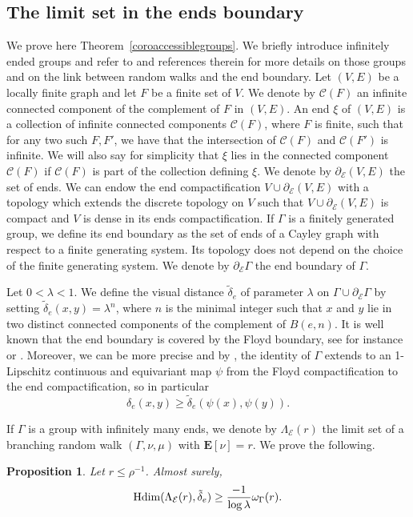 \documentclass{amsart}
\newtheorem{prop}[thm]{Proposition}
\theoremstyle{definition}
\theoremstyle{remark}
\newcommand{\Hdim}{{\rm Hdim}}
\begin{document}
\subsection{The limit set in the ends boundary}\label{sectionends}
We prove here Theorem~\ref{coroaccessiblegroups}.
We briefly introduce infinitely ended groups and refer to \cite[Section~4]{DussauleYang} and references therein for more details on those groups and on the link between random walks and the end boundary.
Let $(V,E)$ be a locally finite graph and let $F$ be a finite set of $V$.
We denote by $\mathcal{C}(F)$ an infinite connected component of the complement of $F$ in $(V,E)$.
An end $\xi$ of $(V,E)$ is a collection of infinite connected components $\mathcal{C}(F)$, where $F$ is finite, such that for any two such $F,F'$, we have that the intersection of $\mathcal{C}(F)$ and $\mathcal{C}(F')$ is infinite.
We will also say for simplicity that $\xi$ lies in the connected component $\mathcal{C}(F)$ if $\mathcal{C}(F)$ is part of the collection defining $\xi$.
We denote by $\partial_{\mathcal{E}}(V,E)$ the set of ends.
We can endow the end compactification $V\cup \partial_{\mathcal{E}}(V,E)$ with a topology which extends the discrete topology on $V$ such that $V\cup \partial_{\mathcal{E}}(V,E)$ is compact and $V$ is dense in its ends compactification.
If $\Gamma$ is a finitely generated group, we define its end boundary as the set of ends of a Cayley graph with respect to a finite generating system.
Its topology does not depend on the choice of the finite generating system.
We denote by $\partial_{\mathcal{E}}\Gamma$ the end boundary of $\Gamma$.

Let $0<\lambda<1$.
We define the visual distance $\tilde{\delta}_e$ of parameter $\lambda$ on $\Gamma \cup \partial_{\mathcal{E}}\Gamma$ by setting
$\tilde{\delta}_e(x,y)=\lambda^n$, where $n$ is the minimal integer such that $x$ and $y$ lie in two distinct connected components of the complement of $B(e,n)$.
It is well known that the end boundary is covered by the Floyd boundary, see for instance \cite[Proposition~11.1]{GGPY} or \cite{Karlssonfreesubgroups}.
Moreover, we can be more precise and by \cite[Lemma~4.3]{DussauleYang}, the identity of $\Gamma$ extends to an 1-Lipschitz continuous and equivariant map $\psi$ from the Floyd compactification to the end compactification, so in particular
$$\delta_e(x,y)\geq \tilde{\delta}_e(\psi(x),\psi(y)).$$

If $\Gamma$ is a group with infinitely many ends, we denote by $\Lambda_{\mathcal{E}}(r)$ the limit set of a branching random walk $(\Gamma,\nu,\mu)$ with $\mathbf E[\nu]=r$.
We prove the following.
\begin{prop}\label{lowerboundends}
Let $r\leq \rho^{-1}$.
Almost surely,
$$\Hdim(\Lambda_\mathcal{E}(r),\tilde{\delta}_e)\geq \frac{-1}{\log \lambda}\omega_{\Gamma}(r).$$
\end{prop}
\end{document}
